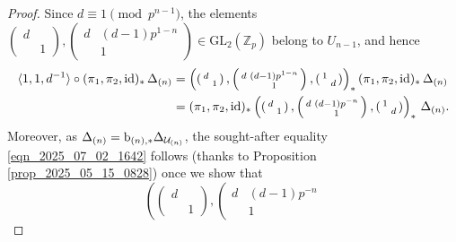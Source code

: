 \documentclass{amsart}
\numberwithin{equation}{section}
\newcommand{\ZZ}{\mathbb{Z}}
\begin{document}
\begin{proof}
Since $d\equiv 1 \pmod{p^{n-1}}$, the elements $\left ( \begin{smallmatrix}
    d & \\ & 1
\end{smallmatrix}\right), \left ( \begin{smallmatrix}
    d & (d-1)p^{1-n}\\ & 1
\end{smallmatrix}\right) \in \mathrm{GL}_2(\ZZ_p)$ belong to $U_{n-1}$, and hence
\begin{align*}
    \langle 1,1,d^{-1}\rangle \circ (\pi_1,\pi_2,{\rm id})_*\,\Delta_{(n)} &= \left (\left ( \begin{smallmatrix}
    d & \\ & 1
\end{smallmatrix}\right), \left ( \begin{smallmatrix}
    d & (d-1)p^{1-n}\\ & 1
\end{smallmatrix}\right), \left ( \begin{smallmatrix}
    1 & \\ & d
\end{smallmatrix}\right)\right)_* (\pi_1,\pi_2,{\rm id})_*\,\Delta_{(n)} \\ &= (\pi_1,\pi_2,{\rm id})_* \left (\left ( \begin{smallmatrix}
    d & \\ & 1
\end{smallmatrix}\right), \left ( \begin{smallmatrix}
    d & (d-1)p^{-n}\\ & 1
\end{smallmatrix}\right), \left ( \begin{smallmatrix}
    1 & \\ & d
\end{smallmatrix}\right)\right)_* \,\Delta_{(n)}.
\end{align*}
Moreover, as $\Delta_{(n)} = {\rm b}_{(n),*}\Delta_{\mathcal{U}_{(n)}}$, the sought-after equality \eqref{eqn_2025_07_02_1642} follows (thanks to Proposition \ref{prop_2025_05_15_0828}) once we show that
\begin{equation}
\label{eqn_2025_07_03_1204} 
\left (\left ( \begin{smallmatrix}
    d & \\ & 1
\end{smallmatrix}\right), \left ( \begin{smallmatrix}
    d & (d-1)p^{-n}\\ & 1

\end{smallmatrix}
\end{equation}
\end{proof}
\end{document}
